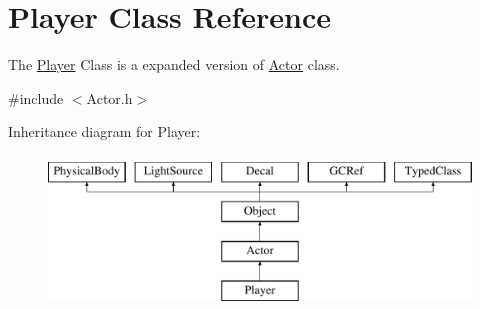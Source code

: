 \hypertarget{classPlayer}{}\section{Player Class Reference}
\label{classPlayer}


The \hyperlink{classPlayer}{Player} Class is a expanded version of \hyperlink{classActor}{Actor} class.  




{\ttfamily \#include $<$Actor.\+h$>$}

Inheritance diagram for Player\+:\begin{figure}[H]
\begin{center}
\leavevmode
\includegraphics[height=4.000000cm]{classPlayer}
\end{center}
\end{figure}
